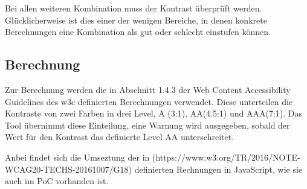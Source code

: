 Bei allen weiteren Kombination muss der Kontrast überprüft werden. Glücklicherweise ist dies einer der wenigen Bereiche, in denen konkrete Berechnungen eine Kombination als gut oder schlecht einstufen können.

\subsection{Berechnung}
Zur Berechnung werden die in Abschnitt 1.4.3 der Web Content Accessibility Guidelines des w3c definierten Berechnungen verwendet. Diese unterteilen die Kontraste von zwei Farben in drei Level, A (3:1), AA(4.5:1) und AAA(7:1). Das Tool übernimmt diese Einteilung, eine Warnung wird ausgegeben, sobald der Wert für den Kontrast das definierte Level AA unterschreitet.

Anbei findet sich die Umseztung der in (https://www.w3.org/TR/2016/NOTE-WCAG20-TECHS-20161007/G18) definierten Rechnungen in JavaScript, wie sie auch im PoC vorhanden ist.


\clearpage

